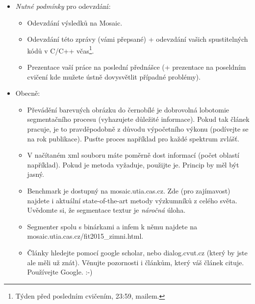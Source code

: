 \documentclass[a4paper,10pt,twocolumn]{article}
\begin{document}
\begin{itemize}

   \item \emph{Nutné podmínky} pro odevzdání:
     \begin{itemize}
	 \item Odevzdání výsledků na Mosaic.
	 \item Odevzdání této zprávy (vámi přepsané)  + odevzdání vašich spustitelných kódů v C/C++ včas\footnote{Týden  před posledním cvičením, 23:59, mailem.}.
	 \item Prezentace vaší práce na poslední přednášce (+ prezentace na poseldním cvičení kde mužete ústně dovysvětlit případné problémy).
     \end{itemize}


   \item Obecně:
     \begin{itemize}
	\item Převádění barevných obrázku do černobílé je dobrovolná lobotomie segmentačního procesu (vyhazujete důležité  informace). Pokud tak článek pracuje, je to pravděpodobně z důvodu výpočetního výkonu (podívejte se na rok publikace). Pusťte proces například pro každé spektrum zvlášť. 
	 \item V načítaném xml souboru máte poměrně dost informací (počet oblastí například). Pokud je metoda vyžaduje, použijte je. Princip by měl být jasný. 
	 \item Benchmark je dostupný na mosaic.utia.cas.cz. Zde (pro zajímavost) najdete i aktuální state-of-the-art metody výzkumníků z celého světa. Uvědomte si, že segmentace textur je \emph{náročná} úloha. 
	\item Segmenter spolu s binárkami a infem k němu najdete na mosaic.utia.cas.cz/fit2015\_zimni.html.
	\item Články hledejte pomocí google scholar, nebo dialog.cvut.cz (který by jste ale měli už znát). Věnujte pozornosti i článkům, který váš článek cituje. Používejte Google. :-)
     \end{itemize}


\end{itemize}
\end{document}
